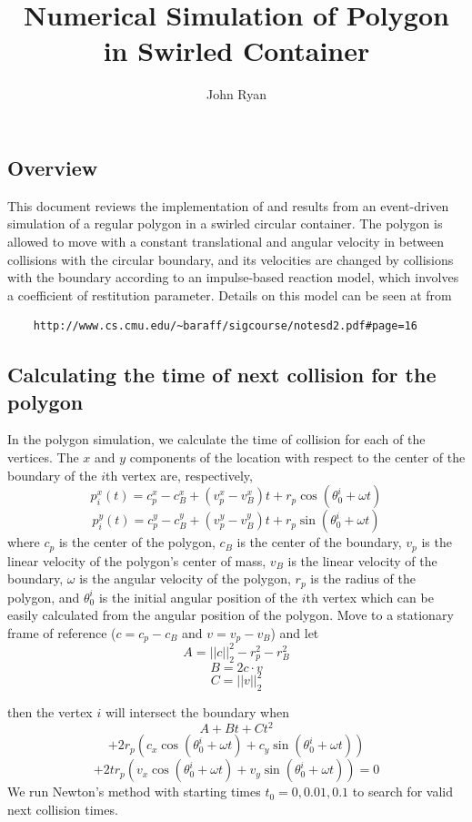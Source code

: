\documentclass{article}
\title{Numerical Simulation of Polygon in Swirled Container}
\author{John Ryan}
\begin{document}
\maketitle
\subsection*{Overview}
This document reviews the implementation of and results from an event-driven simulation of a regular polygon in a swirled circular container. The polygon is allowed to move with a constant translational and angular velocity in between collisions with the circular boundary, and its velocities are changed by collisions with the boundary according to an impulse-based reaction model, which involves a coefficient of restitution parameter. Details on this model can be seen at  from \begin{verbatim}
    http://www.cs.cmu.edu/~baraff/sigcourse/notesd2.pdf#page=16
\end{verbatim} 
\subsection*{Calculating the time of next collision for the polygon}
In the polygon simulation, we calculate the time of collision for each of the vertices. The $x$ and $y$ components of the location with respect to the center of the boundary of the $i$th vertex are, respectively,
\[p_i^x(t)=c_p^x - c_B^x + (v_p^x-v_B^x)t +r_p\cos(\theta_0^i+\omega t)\]
\[p_i^y(t)=c_p^y - c_B^y +  (v_p^y-v_B^y)t +r_p\sin(\theta_0^i+\omega t)\]
where $c_p$ is the center of the polygon, $c_B$ is the center of the boundary, $v_p$ is the linear velocity of the polygon's center of mass, $v_B$ is the linear velocity of the boundary, $\omega$ is the angular velocity of the polygon, $r_p$ is the radius of the polygon, and $\theta_0^i$ is the initial angular position of the $i$th vertex which can be easily calculated from the angular position of the polygon. 
Move to a stationary frame of reference ($c=c_p-c_B$ and $v=v_p-v_B$) and let 
\[A = ||c||_2^2 - r_p^2 - r_B^2\]
\[B = 2c\cdot v\]
\[C = ||v||_2^2\]

then the vertex $i$ will intersect the boundary when 
\[A + Bt + Ct^2 \]
\[+2r_p\left(c_x\cos(\theta_0^i+\omega t) + c_y\sin(\theta_0^i+\omega t)\right)\]
\[+2tr_p\left(v_x\cos(\theta_0^i+\omega t) + v_y\sin(\theta_0^i+\omega t)\right) = 0\]
We run Newton's method with starting times $t_0=0,0.01,0.1$ to search for valid next collision times. 
\end{document}
